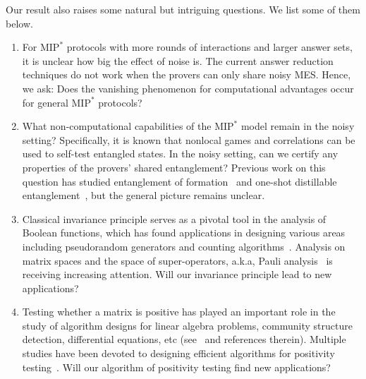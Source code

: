 \documentclass[10pt,a4paper]{article}
\theoremstyle{plain}
\theoremstyle{definition}
\newcommand{\1}{\mathbb{1}} %
\newcommand{\MIP}{\mathrm{MIP}}
\begin{document}
Our result also raises some natural but intriguing questions. We list some of them below.
\begin{enumerate}
    \item For $\MIP^\ast$ protocols with more rounds of interactions and larger answer sets, it is unclear how big the effect of noise is. The current answer reduction techniques do not work when the provers can only share noisy MES. Hence, we ask: Does the vanishing phenomenon for computational advantages occur for general $\MIP^\ast$ protocols?
    \item What non-computational capabilities of the $\MIP^*$ model remain in the noisy setting? Specifically, it is known that nonlocal games and correlations can be used to self-test entangled states. In the noisy setting, can we certify any properties of the provers' shared entanglement? Previous work on this question has studied entanglement of formation~\cite{arnonFYen2018} and one-shot distillable entanglement~\cite{arnon2019device}, but the general picture remains unclear.

    \item Classical invariance principle serves as a pivotal tool in the analysis of Boolean functions, which has found applications in designing various areas including pseudorandom generators and counting algorithms~\cite{10.1145/2395116.2395118,10.1145/3460532,10.1145/3357713.3384281,10.1145/3519935.3519965,10.4230/LIPIcs.CCC.2022.21}. Analysis on matrix spaces and the space of super-operators, a.k.a, Pauli analysis~\cite{10.1145/3618260.3649662} is receiving increasing attention\cite{pmlr-v195-bao23b, doi:10.1137/1.9781611977554.ch43,arunachalam_et_al:LIPIcs.ICALP.2024.13,10.1145/3618260.3649662,Rouze2024,klein_et_al:LIPIcs.ITCS.2024.69,slote2024noncommutativebohnenblusthilleinequalityqudit}.  Will our invariance principle lead to new applications?

    \item Testing whether a matrix is positive has played an important role in the study of algorithm designs for linear algebra problems, community structure detection, differential equations, etc (see~\cite{bakshi2020testing} and references therein). Multiple studies have been devoted to designing efficient algorithms for positivity testing~\cite{9996743,han2017approximating,bakshi2020testing}. Will our algorithm of positivity testing find new applications?
\end{enumerate}
\end{document}
